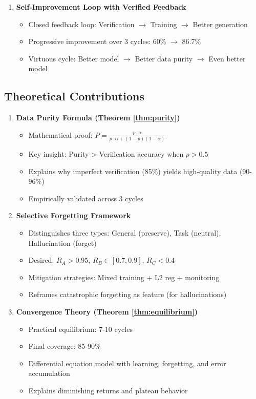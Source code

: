 \documentclass[12pt,a4paper]{article}
\theoremstyle{definition}
\begin{document}
\begin{enumerate}
    \item \textbf{Self-Improvement Loop with Verified Feedback}
    \begin{itemize}
        \item Closed feedback loop: Verification $\rightarrow$ Training $\rightarrow$ Better generation
        \item Progressive improvement over 3 cycles: 60\% $\rightarrow$ 86.7\%
        \item Virtuous cycle: Better model $\rightarrow$ Better data purity $\rightarrow$ Even better model
    \end{itemize}
\end{enumerate}

\subsection{Theoretical Contributions}

\begin{enumerate}
    \item \textbf{Data Purity Formula (Theorem \ref{thm:purity})}
    \begin{itemize}
        \item Mathematical proof: $P = \frac{p \cdot \alpha}{p \cdot \alpha + (1-p)(1-\alpha)}$
        \item Key insight: Purity > Verification accuracy when $p > 0.5$
        \item Explains why imperfect verification (85\%) yields high-quality data (90-96\%)
        \item Empirically validated across 3 cycles
    \end{itemize}
    
    \item \textbf{Selective Forgetting Framework}
    \begin{itemize}
        \item Distinguishes three types: General (preserve), Task (neutral), Hallucination (forget)
        \item Desired: $R_A > 0.95$, $R_B \in [0.7, 0.9]$, $R_C < 0.4$
        \item Mitigation strategies: Mixed training + L2 reg + monitoring
        \item Reframes catastrophic forgetting as feature (for hallucinations)
    \end{itemize}
    
    \item \textbf{Convergence Theory (Theorem \ref{thm:equilibrium})}
    \begin{itemize}
        \item Practical equilibrium: 7-10 cycles
        \item Final coverage: 85-90\%
        \item Differential equation model with learning, forgetting, and error accumulation
        \item Explains diminishing returns and plateau behavior
    \end{itemize}
\end{enumerate}
\end{document}
